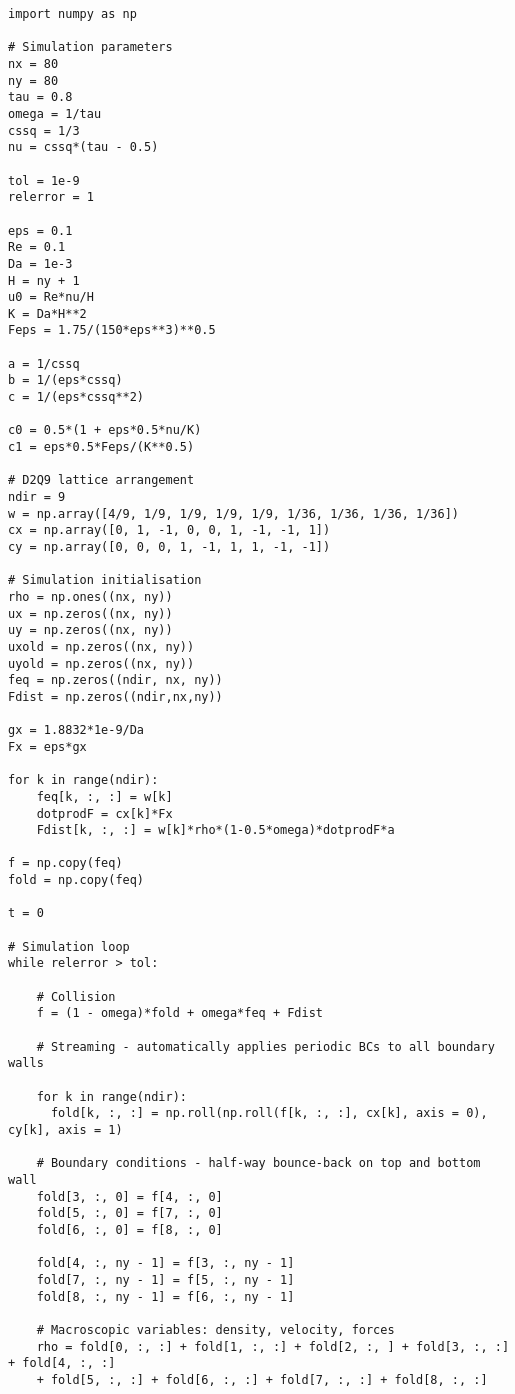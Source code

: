 \begin{mdframed}[backgroundcolor=red!10, linecolor=red!10]
\begin{verbatim}
import numpy as np

# Simulation parameters
nx = 80
ny = 80
tau = 0.8
omega = 1/tau
cssq = 1/3
nu = cssq*(tau - 0.5)

tol = 1e-9
relerror = 1

eps = 0.1 
Re = 0.1
Da = 1e-3
H = ny + 1 
u0 = Re*nu/H 
K = Da*H**2
Feps = 1.75/(150*eps**3)**0.5

a = 1/cssq
b = 1/(eps*cssq)
c = 1/(eps*cssq**2)

c0 = 0.5*(1 + eps*0.5*nu/K)
c1 = eps*0.5*Feps/(K**0.5)

# D2Q9 lattice arrangement
ndir = 9
w = np.array([4/9, 1/9, 1/9, 1/9, 1/9, 1/36, 1/36, 1/36, 1/36])
cx = np.array([0, 1, -1, 0, 0, 1, -1, -1, 1])
cy = np.array([0, 0, 0, 1, -1, 1, 1, -1, -1])

# Simulation initialisation
rho = np.ones((nx, ny)) 
ux = np.zeros((nx, ny))
uy = np.zeros((nx, ny))
uxold = np.zeros((nx, ny))
uyold = np.zeros((nx, ny))
feq = np.zeros((ndir, nx, ny))
Fdist = np.zeros((ndir,nx,ny)) 

gx = 1.8832*1e-9/Da
Fx = eps*gx 

for k in range(ndir):
    feq[k, :, :] = w[k] 
    dotprodF = cx[k]*Fx
    Fdist[k, :, :] = w[k]*rho*(1-0.5*omega)*dotprodF*a

f = np.copy(feq)
fold = np.copy(feq)

t = 0

# Simulation loop
while relerror > tol: 

    # Collision
    f = (1 - omega)*fold + omega*feq + Fdist

    # Streaming - automatically applies periodic BCs to all boundary walls

    for k in range(ndir):
      fold[k, :, :] = np.roll(np.roll(f[k, :, :], cx[k], axis = 0), cy[k], axis = 1)

    # Boundary conditions - half-way bounce-back on top and bottom wall
    fold[3, :, 0] = f[4, :, 0]
    fold[5, :, 0] = f[7, :, 0]
    fold[6, :, 0] = f[8, :, 0]

    fold[4, :, ny - 1] = f[3, :, ny - 1]
    fold[7, :, ny - 1] = f[5, :, ny - 1]
    fold[8, :, ny - 1] = f[6, :, ny - 1]

    # Macroscopic variables: density, velocity, forces
    rho = fold[0, :, :] + fold[1, :, :] + fold[2, :, ] + fold[3, :, :] + fold[4, :, :] 
    + fold[5, :, :] + fold[6, :, :] + fold[7, :, :] + fold[8, :, :]


\end{verbatim}
\end{mdframed}
